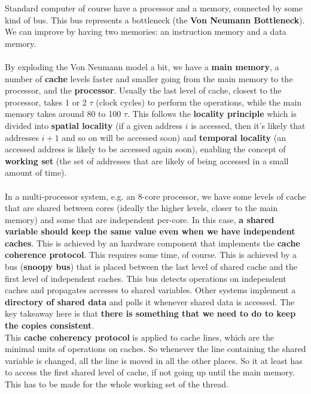 \documentclass[10pt]{report}
\begin{document}
Standard computer of course have a processor and a memory, connected by some kind of bus. This bus represents a bottleneck (the \textbf{Von Neumann Bottleneck}). We can improve by having two memories: an instruction memory and a data memory.\\\\
By exploding the Von Neumann model a bit, we have a \textbf{main memory}, a number of \textbf{cache} levels faster and smaller going from the main memory to the processor, and the \textbf{processor}. Usually the last level of cache, closest to the processor, takes 1 or 2 $\tau$ (clock cycles) to perform the operations, while the main memory takes around 80 to 100 $\tau$. This follows the \textbf{locality principle} which is divided into \textbf{spatial locality} (if a given address $i$ is accessed, then it's likely that addresses $i+1$ and so on will be accessed soon)  and \textbf{temporal locality} (an accessed address is likely to be accessed again soon), enabling the concept of \textbf{working set} (the set of addresses that are likely of being accessed in a small amount of time).\\\\
In a multi-processor system, e.g. an 8-core processor, we have some levels of cache that are shared between cores (ideally the higher levels, closer to the main memory) and some that are independent per-core. In this case, \textbf{a shared variable should keep the same value even when we have independent caches}. This is achieved by an hardware component that implements the \textbf{cache coherence protocol}. This requires some time, of course. This is achieved by a bus (\textbf{snoopy bus}) that is placed between the last level of shared cache and the first level of independent caches. This bus detects operations on independent caches and propagates accesses to shared variables. Other systems implement a \textbf{directory of shared data} and polls it whenever shared data is accessed. The key takeaway here is that \textbf{there is something that we need to do to keep the copies consistent}.\\
This \textbf{cache coherency protocol} is applied to cache lines, which are the minimal units of operations on caches. So whenever the line containing the shared variable is changed, all the line is moved in all the other places. So it at least has to access the first shared level of cache, if not going up until the main memory. This has to be made for the whole working set of the thread.
\end{document}
